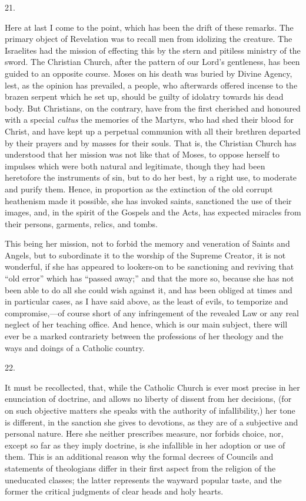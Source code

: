 21.

Here at last I come to the point, which has been the drift of these
remarks. The primary object of Revelation was to recall men from
idolizing the creature. The Israelites had the mission of effecting
this by the stern and pitiless ministry of the sword. The Christian
Church, after the pattern of our Lord's gentleness, has been guided to
an opposite course. Moses on his death was buried by Divine Agency,
lest, as the opinion has prevailed, a people, who afterwards offered
incense to the brazen serpent which he set up, should be
guilty of idolatry towards his dead body. But Christians, on the
contrary, have from the first cherished and honoured with a special \emph{cultus}
the memories of the Martyrs, who had shed their blood for Christ, and
have kept up a perpetual communion with all their brethren departed by
their prayers and by masses for their souls. That is, the Christian
Church has understood that her mission was not like that of Moses, to
oppose herself to impulses which were both natural and legitimate,
though they had been heretofore the instruments of sin, but to do her
best, by a right use, to moderate and purify them. Hence, in
proportion as the extinction of the old corrupt heathenism made it
possible, she has invoked saints, sanctioned the use of their images,
and, in the spirit of the Gospels and the Acts, has expected miracles
from their persons, garments, relics, and tombs.

This being her mission, not to forbid the memory and veneration of
Saints and Angels, but to subordinate it to the worship of the Supreme
Creator, it is not wonderful, if she has appeared to lookers-on to be
sanctioning and reviving that ``old error'' which has
``passed away;'' and that the more so, because she has not
been able to do all she could wish against it, and has been obliged at
times and in particular cases, as I have said above, as the least of
evils, to temporize and compromise,—of course short of any
infringement of the revealed Law or any real neglect of her teaching
office. And hence, which is our main subject, there will ever be a
marked contrariety between the professions of her theology and the
ways and doings of a Catholic country.

22.

It must be recollected, that, while the Catholic Church is ever
most precise in her enunciation of doctrine, and allows no liberty of
dissent from her decisions, (for on such objective matters she speaks
with the authority of infallibility,) her tone is different, in the
sanction she gives to devotions, as they are of a subjective and
personal nature. Here she neither prescribes measure, nor forbids
choice, nor, except so far as they imply doctrine, is she infallible
in her adoption or use of them. This is an additional reason why the
formal decrees of Councils and statements of theologians differ in
their first aspect from the religion of the uneducated classes; the
latter represents the wayward popular taste, and the former the
critical judgments of clear heads and holy hearts.

